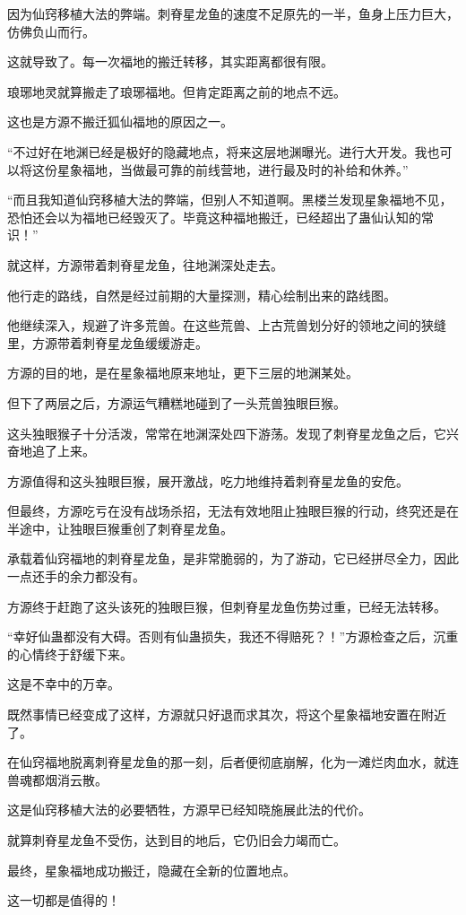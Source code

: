 \begin{this_body}
因为仙窍移植大法的弊端。刺脊星龙鱼的速度不足原先的一半，鱼身上压力巨大，仿佛负山而行。

这就导致了。每一次福地的搬迁转移，其实距离都很有限。

琅琊地灵就算搬走了琅琊福地。但肯定距离之前的地点不远。

这也是方源不搬迁狐仙福地的原因之一。

“不过好在地渊已经是极好的隐藏地点，将来这层地渊曝光。进行大开发。我也可以将这份星象福地，当做最可靠的前线营地，进行最及时的补给和休养。”

“而且我知道仙窍移植大法的弊端，但别人不知道啊。黑楼兰发现星象福地不见，恐怕还会以为福地已经毁灭了。毕竟这种福地搬迁，已经超出了蛊仙认知的常识！”

就这样，方源带着刺脊星龙鱼，往地渊深处走去。

他行走的路线，自然是经过前期的大量探测，精心绘制出来的路线图。

他继续深入，规避了许多荒兽。在这些荒兽、上古荒兽划分好的领地之间的狭缝里，方源带着刺脊星龙鱼缓缓游走。

方源的目的地，是在星象福地原来地址，更下三层的地渊某处。

但下了两层之后，方源运气糟糕地碰到了一头荒兽独眼巨猴。

这头独眼猴子十分活泼，常常在地渊深处四下游荡。发现了刺脊星龙鱼之后，它兴奋地追了上来。

方源值得和这头独眼巨猴，展开激战，吃力地维持着刺脊星龙鱼的安危。

但最终，方源吃亏在没有战场杀招，无法有效地阻止独眼巨猴的行动，终究还是在半途中，让独眼巨猴重创了刺脊星龙鱼。

承载着仙窍福地的刺脊星龙鱼，是非常脆弱的，为了游动，它已经拼尽全力，因此一点还手的余力都没有。

方源终于赶跑了这头该死的独眼巨猴，但刺脊星龙鱼伤势过重，已经无法转移。

“幸好仙蛊都没有大碍。否则有仙蛊损失，我还不得赔死？！”方源检查之后，沉重的心情终于舒缓下来。

这是不幸中的万幸。

既然事情已经变成了这样，方源就只好退而求其次，将这个星象福地安置在附近了。

在仙窍福地脱离刺脊星龙鱼的那一刻，后者便彻底崩解，化为一滩烂肉血水，就连兽魂都烟消云散。

这是仙窍移植大法的必要牺牲，方源早已经知晓施展此法的代价。

就算刺脊星龙鱼不受伤，达到目的地后，它仍旧会力竭而亡。

最终，星象福地成功搬迁，隐藏在全新的位置地点。

这一切都是值得的！

\end{this_body}

